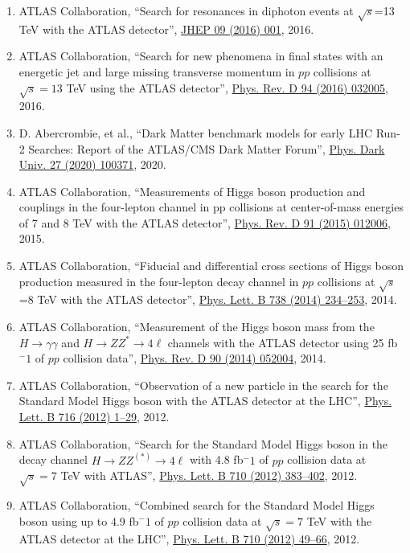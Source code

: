 \begin{enumerate}
\item ATLAS Collaboration, ``Search for resonances in diphoton events at $\sqrt{s}$=13 TeV with the ATLAS detector'', \href{https://doi.org/10.1007/JHEP09(2016)001}{JHEP 09 (2016) 001}, 2016.
\item ATLAS Collaboration, ``Search for new phenomena in final states with an energetic jet and large missing transverse momentum in $pp$ collisions at $\sqrt{s}=13$  TeV using the ATLAS detector'', \href{https://doi.org/10.1103/PhysRevD.94.032005}{Phys. Rev. D 94 (2016) 032005}, 2016.
\item D. Abercrombie, et al., ``Dark Matter benchmark models for early LHC Run-2 Searches: Report of the ATLAS/CMS Dark Matter Forum'', \href{https://doi.org/10.1016/j.dark.2019.100371}{Phys. Dark Univ. 27 (2020) 100371}, 2020.
\item ATLAS Collaboration, ``Measurements of Higgs boson production and couplings in the four-lepton channel in pp collisions at center-of-mass energies of 7 and 8 TeV with the ATLAS detector'', \href{https://doi.org/10.1103/PhysRevD.91.012006}{Phys. Rev. D 91 (2015) 012006}, 2015.
\item ATLAS Collaboration, ``Fiducial and differential cross sections of Higgs boson production measured in the four-lepton decay channel in $pp$ collisions at $\sqrt{s}$=8 TeV with the ATLAS detector'', \href{https://doi.org/10.1016/j.physletb.2014.09.054}{Phys. Lett. B 738 (2014) 234--253}, 2014.
\item ATLAS Collaboration, ``Measurement of the Higgs boson mass from the $H\to \gamma\gamma$ and $H \to ZZ^* \to 4\ell$ channels with the ATLAS detector using 25 fb$^-1$ of $pp$ collision data'', \href{https://doi.org/10.1103/PhysRevD.90.052004}{Phys. Rev. D 90 (2014) 052004}, 2014.
\item ATLAS Collaboration, ``Observation of a new particle in the search for the Standard Model Higgs boson with the ATLAS detector at the LHC'', \href{https://doi.org/10.1016/j.physletb.2012.08.020}{Phys. Lett. B 716 (2012) 1--29}, 2012.
\item ATLAS Collaboration, ``Search for the Standard Model Higgs boson in the decay channel $H \to ZZ^(*) \to 4 \ell$ with 4.8 fb$^-1$ of $pp$ collision data at $\sqrt{s}=7$ TeV with ATLAS'', \href{https://doi.org/10.1016/j.physletb.2012.03.005}{Phys. Lett. B 710 (2012) 383--402}, 2012.
\item ATLAS Collaboration, ``Combined search for the Standard Model Higgs boson using up to 4.9 fb$^-1$ of $pp$ collision data at $\sqrt{s}=7$ TeV with the ATLAS detector at the LHC'', \href{https://doi.org/10.1016/j.physletb.2012.02.044}{Phys. Lett. B 710 (2012) 49--66}, 2012.

\end{enumerate}
